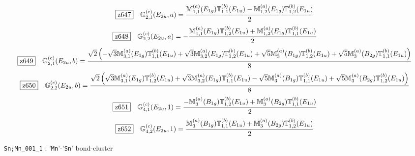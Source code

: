 \documentclass[fleqn,10pt,landscape]{jsarticle}
\begin{document}
\begin{dmath*}
\hspace*{3mm}\fbox{z647}\quad \mathbb{G}_{2,1}^{(c)}(E_{2u},a)=\frac{\mathbb{M}_{1,1}^{(a)}(E_{1g}) \mathbb{T}_{1,1}^{(b)}(E_{1u}) - \mathbb{M}_{1,2}^{(a)}(E_{1g}) \mathbb{T}_{1,2}^{(b)}(E_{1u})}{2}
\end{dmath*}
\begin{dmath*}
\hspace*{3mm}\fbox{z648}\quad \mathbb{G}_{2,2}^{(c)}(E_{2u},a)=- \frac{\mathbb{M}_{1,1}^{(a)}(E_{1g}) \mathbb{T}_{1,2}^{(b)}(E_{1u}) + \mathbb{M}_{1,2}^{(a)}(E_{1g}) \mathbb{T}_{1,1}^{(b)}(E_{1u})}{2}
\end{dmath*}
\begin{dmath*}
\hspace*{3mm}\fbox{z649}\quad \mathbb{G}_{2,1}^{(c)}(E_{2u},b)=\frac{\sqrt{2} \left(- \sqrt{3} \mathbb{M}_{3,1}^{(a)}(E_{1g}) \mathbb{T}_{1,1}^{(b)}(E_{1u}) + \sqrt{3} \mathbb{M}_{3,2}^{(a)}(E_{1g}) \mathbb{T}_{1,2}^{(b)}(E_{1u}) + \sqrt{5} \mathbb{M}_{3}^{(a)}(B_{1g}) \mathbb{T}_{1,2}^{(b)}(E_{1u}) + \sqrt{5} \mathbb{M}_{3}^{(a)}(B_{2g}) \mathbb{T}_{1,1}^{(b)}(E_{1u})\right)}{8}
\end{dmath*}
\begin{dmath*}
\hspace*{3mm}\fbox{z650}\quad \mathbb{G}_{2,2}^{(c)}(E_{2u},b)=\frac{\sqrt{2} \left(\sqrt{3} \mathbb{M}_{3,1}^{(a)}(E_{1g}) \mathbb{T}_{1,2}^{(b)}(E_{1u}) + \sqrt{3} \mathbb{M}_{3,2}^{(a)}(E_{1g}) \mathbb{T}_{1,1}^{(b)}(E_{1u}) - \sqrt{5} \mathbb{M}_{3}^{(a)}(B_{1g}) \mathbb{T}_{1,1}^{(b)}(E_{1u}) + \sqrt{5} \mathbb{M}_{3}^{(a)}(B_{2g}) \mathbb{T}_{1,2}^{(b)}(E_{1u})\right)}{8}
\end{dmath*}
\begin{dmath*}
\hspace*{3mm}\fbox{z651}\quad \mathbb{G}_{4,1}^{(c)}(E_{2u},1)=\frac{- \mathbb{M}_{3}^{(a)}(B_{1g}) \mathbb{T}_{1,2}^{(b)}(E_{1u}) + \mathbb{M}_{3}^{(a)}(B_{2g}) \mathbb{T}_{1,1}^{(b)}(E_{1u})}{2}
\end{dmath*}
\begin{dmath*}
\hspace*{3mm}\fbox{z652}\quad \mathbb{G}_{4,2}^{(c)}(E_{2u},1)=\frac{\mathbb{M}_{3}^{(a)}(B_{1g}) \mathbb{T}_{1,1}^{(b)}(E_{1u}) + \mathbb{M}_{3}^{(a)}(B_{2g}) \mathbb{T}_{1,2}^{(b)}(E_{1u})}{2}
\end{dmath*}
\vspace{5mm}

\noindent\textbullet\, \texttt{Sn;Mn_001_1} : '\texttt{Mn}'-'\texttt{Sn}' bond-cluster
\end{document}

